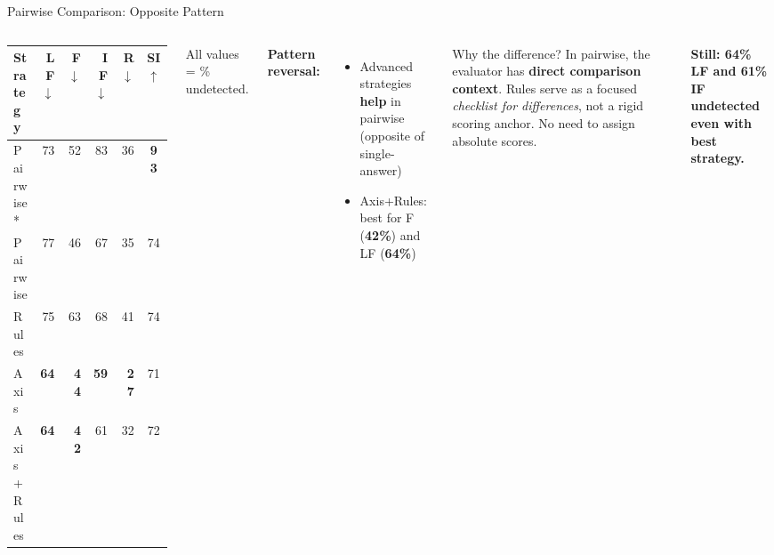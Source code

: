 \documentclass[aspectratio=169,10pt]{beamer}
\newcommand{\good}[1]{\textcolor{green!60!black}{\textbf{#1}}}
\newcommand{\bad}[1]{\textcolor{aclred}{\textbf{#1}}}
\begin{document}
\begin{frame}{Pairwise Comparison: Opposite Pattern}
  \begin{columns}[T]
      \small
      \begin{tabular}{lrrrrc}
        \toprule
        \textbf{Strategy} & \textbf{LF}$\downarrow$ & \textbf{F}$\downarrow$ & \textbf{IF}$\downarrow$ & \textbf{R}$\downarrow$ & \textbf{SI}$\uparrow$ \\
        \midrule
        Pairwise*   & 73 & 52 & 83 & 36 & \good{93} \\
        Pairwise    & 77 & 46 & 67 & 35 & 74 \\
        Rules       & 75 & 63 & 68 & 41 & 74 \\
        \rowcolor{acllightblue}
        Axis        & \good{64} & \good{44} & \good{59} & \good{27} & 71 \\
        Axis+Rules  & \good{64} & \good{42} & 61 & 32 & 72 \\
        \bottomrule
      \end{tabular}
      \vspace{0.3em}
      \small All values = \% undetected.

      \textbf{Pattern reversal:}
      \begin{itemize}
        \item Advanced strategies \good{help} in pairwise (opposite of single-answer)
        \item Axis+Rules: best for F (\good{42\%}) and LF (\good{64\%})
      \end{itemize}

      \vspace{0.4em}
      \begin{block}{Why the difference?}
        In pairwise, the evaluator has \textbf{direct comparison context}. Rules serve as a focused \emph{checklist for differences}, not a rigid scoring anchor. No need to assign absolute scores.
      \end{block}

      \vspace{0.3em}
      \small \bad{Still: 64\% LF and 61\% IF undetected even with best strategy.}
  \end{columns}
\end{frame}
\end{document}
